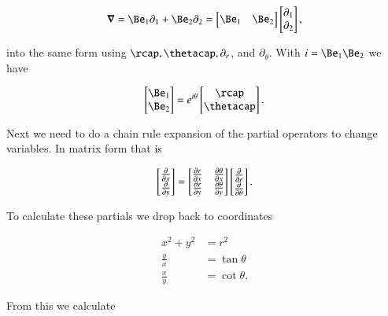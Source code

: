 \begin{align}\label{eqn:divGradCurLap:4}
\spacegrad 
= \Be_1 \partial_1 + \Be_2 \partial_2
= 
\begin{bmatrix}
\Be_1 & \Be_2 
\end{bmatrix}
\begin{bmatrix}
\partial_1 \\
\partial_2 
\end{bmatrix},
\end{align}

into the same form using $\rcap, \thetacap, \partial_r$, and $\partial_\theta$.  With $i = \Be_1 \Be_2$ we have

\begin{align}\label{eqn:divGradCurLap:5}
\begin{bmatrix}
\Be_1 \\
\Be_2
\end{bmatrix}
=
e^{i\theta}
\begin{bmatrix}
\rcap \\
\thetacap
\end{bmatrix}.
\end{align}

Next we need to do a chain rule expansion of the partial operators to change variables.  In matrix form that is

\begin{align}\label{eqn:divGradCurLap:6}
\begin{bmatrix}
\PD{x}{} \\
\PD{y}{} 
\end{bmatrix}
= 
\begin{bmatrix}
\PD{x}{r} &          \PD{x}{\theta} \\
\PD{y}{r} &          \PD{y}{\theta} 
\end{bmatrix}
\begin{bmatrix}
\PD{r}{} \\
\PD{\theta}{} 
\end{bmatrix}.
\end{align}

To calculate these partials we drop back to coordinates

\begin{align}\label{eqn:divGradCurLap:7}
x^2 + y^2 &= r^2 \\
\frac{y}{x} &= \tan\theta \\
\frac{x}{y} &= \cot\theta.
\end{align}

From this we calculate

